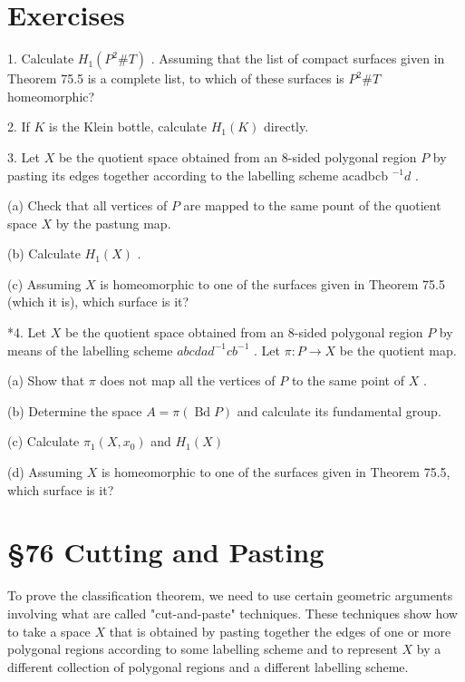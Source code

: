 \documentclass[10pt]{article}
\begin{document}
\section*{Exercises}

1. Calculate \({H}_{1}\left( {{P}^{2}\# T}\right)\) . Assuming that the list of compact surfaces given in Theorem 75.5 is a complete list, to which of these surfaces is \({P}^{2}\# T\) homeomorphic?

2. If \(K\) is the Klein bottle, calculate \({H}_{1}\left( K\right)\) directly.

3. Let \(X\) be the quotient space obtained from an 8-sided polygonal region \(P\) by pasting its edges together according to the labelling scheme acadbcb \({}^{-1}d\) .

(a) Check that all vertices of \(P\) are mapped to the same pount of the quotient space \(X\) by the pastung map.

(b) Calculate \({H}_{1}\left( X\right)\) .

(c) Assuming \(X\) is homeomorphic to one of the surfaces given in Theorem 75.5 (which it is), which surface is it?

*4. Let \(X\) be the quotient space obtained from an 8-sided polygonal region \(P\) by means of the labelling scheme \({abcda}{d}^{-1}c{b}^{-1}\) . Let \(\pi  : P \rightarrow  X\) be the quotient map.

(a) Show that \(\pi\) does not map all the vertices of \(P\) to the same point of \(X\) .

(b) Determine the space \(A = \pi \left( {\operatorname{Bd}P}\right)\) and calculate its fundamental group.

(c) Calculate \({\pi }_{1}\left( {X,{x}_{0}}\right)\) and \({H}_{1}\left( X\right)\)

(d) Assuming \(X\) is homeomorphic to one of the surfaces given in Theorem 75.5, which surface is it?

\section*{§76 Cutting and Pasting}

To prove the classification theorem, we need to use certain geometric arguments involving what are called "cut-and-paste" techniques. These techniques show how to take a space \(X\) that is obtained by pasting together the edges of one or more polygonal regions according to some labelling scheme and to represent \(X\) by a different collection of polygonal regions and a different labelling scheme.
\end{document}
